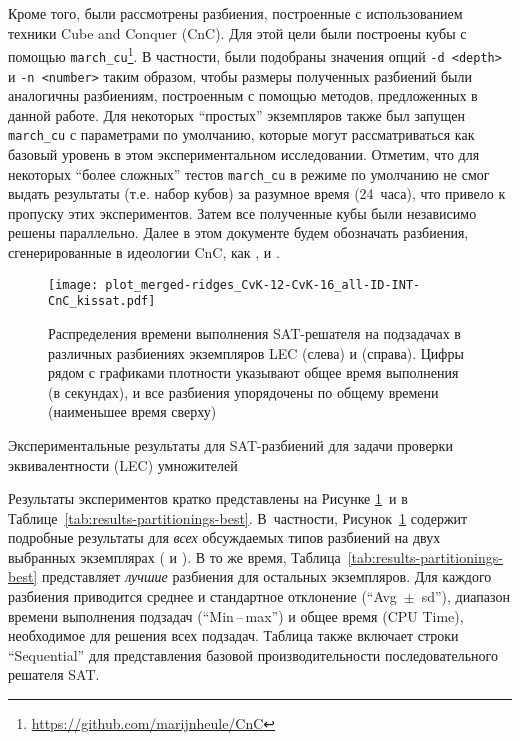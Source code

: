 Кроме того, были рассмотрены разбиения, построенные с использованием техники Cube and Conquer (CnC).
Для этой цели были построены кубы с помощью \texttt{march\_cu}\footnote{\url{https://github.com/marijnheule/CnC}}.
В частности, были подобраны значения опций \texttt{-d <depth>} и \texttt{-n <number>} таким образом, чтобы размеры полученных разбиений были аналогичны разбиениям, построенным с помощью методов, предложенных в данной работе.
Для некоторых \enquote{простых} экземпляров также был запущен \texttt{march\_cu} с параметрами по умолчанию, которые могут рассматриваться как базовый уровень в этом экспериментальном исследовании.
Отметим, что для некоторых \enquote{более сложных} тестов \texttt{march\_cu} в режиме по умолчанию не смог выдать результаты (т.е. набор кубов) за разумное время (24~часа), что привело к пропуску этих экспериментов.
Затем все полученные кубы были независимо решены параллельно.
Далее в этом документе будем обозначать разбиения, сгенерированные в идеологии CnC, как ,  и .

\begin{figure}[!ht]
    \centering
    \texttt{[image: plot\_merged-ridges\_CvK-12-CvK-16\_all-ID-INT-CnC\_kissat.pdf]}
    \caption{Распределения времени выполнения SAT-решателя на подзадачах в различных разбиениях экземпляров LEC  (слева) и  (справа). Цифры рядом с графиками плотности указывают общее время выполнения (в секундах), и все разбиения упорядочены по общему времени (наименьшее время сверху)}
    \label{fig:ridges}
\end{figure}

\begin{table}[p]
    \centering
    \caption{Экспериментальные результаты для SAT-разбиений для задачи проверки эквивалентности (LEC) умножителей}
    \label{tab:results-partitionings-best}
    
\end{table}

Результаты экспериментов кратко представлены на Рисунке \ref{fig:ridges}~и в Таблице~\ref{tab:results-partitionings-best}.
В~частности, Рисунок~\ref{fig:ridges} содержит
подробные результаты для \textit{всех} обсуждаемых типов разбиений на двух выбранных экземплярах ( и ).
В то же время, Таблица~\ref{tab:results-partitionings-best} представляет \emph{лучшие} разбиения для остальных экземпляров.
Для каждого разбиения приводится среднее и стандартное отклонение (\enquote{Avg~$\pm$~sd}), диапазон времени выполнения подзадач (\enquote{Min\,--\,max}) и общее  время (CPU Time), необходимое для решения всех подзадач.
Таблица также включает строки \enquote{Sequential} для представления базовой производительности последовательного решателя SAT.


